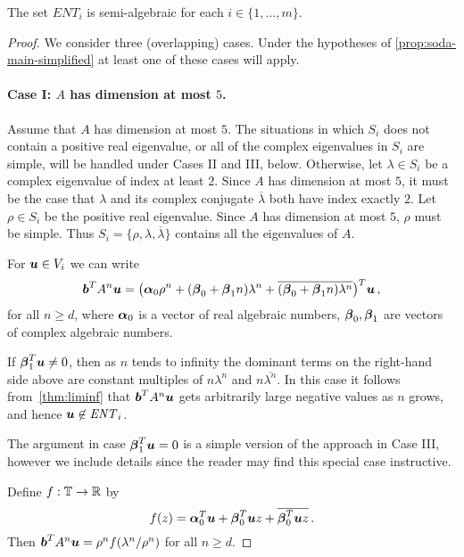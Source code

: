 \begin{proposition}
The set $\mathit{ENT}_i$ is semi-algebraic for each $i\in \{1,\ldots,m\}$.
\label{prop:semi-alg}
\end{proposition}
\begin{proof}
  We consider three (overlapping) cases.  Under the hypotheses of
  \cref{prop:soda-main-simplified} at least one of these cases will apply.

\paragraph{Case I: $A$ has dimension at most $5$.}
Assume that $A$ has dimension at most $5$.  The situations in which
$S_i$ does not contain a positive real eigenvalue, or
all of the complex eigenvalues in $S_i$ are simple, will be handled
under Cases II and III, below.  Otherwise, let $\lambda\in S_i$ be a complex
eigenvalue of index at least $2$.  Since $A$ has dimension at most
$5$, it must be the case that $\lambda$ and its complex conjugate
$\overline{\lambda}$ both have index exactly $2$.  Let $\rho \in S_i$
be the positive real eigenvalue.  Since
$A$ has dimension at most $5$, $\rho$ must be simple.  Thus
$S_i=\{\rho,\lambda,\overline{\lambda}\}$ contains all the eigenvalues
of $A$.

For $\boldsymbol{u}\in V_i$ we can write
\begin{align*}
\myvector{b}^TA^n\myvector{u} =
\big(\myvector{\alpha}_0\rho^n  + (\myvector{\beta}_0+ \myvector{\beta}_1n)\lambda^n
 + \overline{(\myvector{\beta}_0+\myvector{\beta}_1n)
\lambda^n}\big)^T\myvector{u} \, ,
\label{eq:small}
\end{align*}
for all $n\geq d$,
where $\boldsymbol{\alpha}_0$ is a vector of real algebraic numbers,
$\boldsymbol{\beta}_0,\boldsymbol{\beta}_1$ are vectors of complex
algebraic numbers.

If $\boldsymbol{\beta}_1^T\boldsymbol{u}\neq 0$, then as $n$ tends to
infinity the dominant terms on the right-hand side above are constant
multiples of $n\lambda^n$ and $n\overline{\lambda^n}$.  In this case
it follows from~\cref{thm:liminf} that
$\boldsymbol{b}^{T} A^{n}\boldsymbol{u}$ gets arbitrarily large negative values as
$n$ grows, and hence $\boldsymbol{u}\not\in\mathit{ENT}_i$.

The argument in case $\boldsymbol{\beta}_1^T\boldsymbol{u}=0$ is a
simple version of the approach in Case III, however we include details
since the reader may find this special case instructive.

Define $f:\mathbb{T}\rightarrow\mathbb{R}$ by
\[ f(z)=\boldsymbol{\alpha}_0^T\boldsymbol{u}+
\boldsymbol{\beta}_0^T\boldsymbol{u}z+
\overline{\boldsymbol{\beta}_0^T\boldsymbol{u}z} \, .\]
Then $\boldsymbol{b}^TA^n\boldsymbol{u} = \rho^n f(\lambda^n/\rho^n)$ for all $n\geq d$.


\end{proof}
